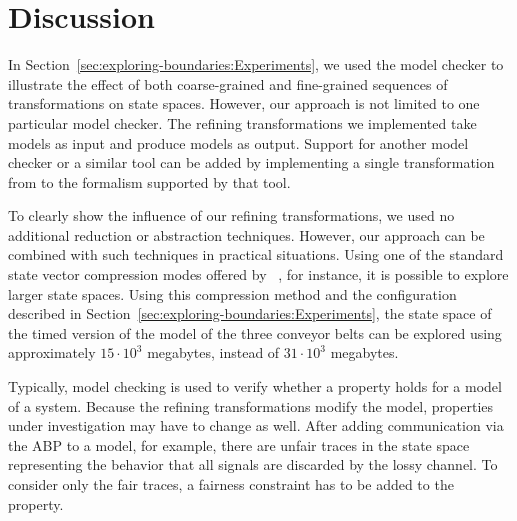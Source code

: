 \section{Discussion}
\label{sec:exploring-boundaries:Discussion}
In Section~\ref{sec:exploring-boundaries:Experiments}, we used the model checker \Spin to illustrate the effect of both coarse-grained and fine-grained sequences of transformations on state spaces.
However, our approach is not limited to one particular model checker.
The refining transformations we implemented take \SLCO models as input and produce \SLCO models as output.
Support for another model checker or a similar tool can be added by implementing a single transformation from \SLCO to the formalism supported by that tool.

To clearly show the influence of our refining transformations, we used no additional reduction or abstraction techniques.
However, our approach can be combined with such techniques in practical situations.
Using one of the standard state vector compression modes offered by \Spin~\cite{Holzmann1997}, for instance, it is possible to explore larger state spaces.
Using this compression method and the configuration described in Section~\ref{sec:exploring-boundaries:Experiments}, the state space of the timed version of the model of the three conveyor belts can be explored using approximately $15\cdot10^3$ megabytes, instead of $31\cdot10^3$ megabytes.

Typically, model checking is used to verify whether a property holds for a model of a system.
Because the refining transformations modify the model, properties under investigation may have to change as well.
After adding communication via the ABP to a model, for example, there are unfair traces in the state space representing the behavior that all signals are discarded by the lossy channel.
To consider only the fair traces, a fairness constraint has to be added to the property. 